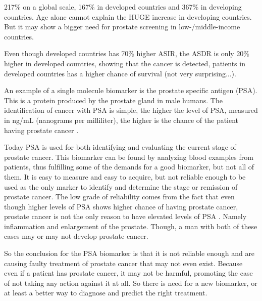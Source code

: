 \documentclass[UKenglish]{ifimaster}
\begin{document}
217\% on a global scale, 167\% in developed countries and 367\% in developing
countries. Age alone cannot explain the HUGE increase in developing countries.
But it may show a bigger need for prostate screening in low-/middle-income
countries.

Even though developed countries has 70\% higher ASIR, the ASDR is only 20\%
higher in developed countries, showing that the cancer is detected, patients in
developed countries has a higher chance of survival (not very surprising...).

An example of a single molecule biomarker is the prostate specific antigen
(PSA). This is a protein produced by the prostate gland in male humans. The
identification of cancer with PSA is simple, the higher the level of PSA,
measured in ng/mL (nanograms per milliliter), the higher is the chance of the
patient having prostate cancer \cite{cancerfacts}.

Today PSA is used for both identifying and evaluating the current stage of
prostate cancer. This biomarker can be found by analyzing blood examples from
patients, thus fulfilling some of the demands for a good biomarker, but not all
of them. It is easy to measure and easy to acquire, but not reliable enough to
be used as the only marker to identify and determine the stage or remission of
prostate cancer. The low grade of reliability comes from the fact that even
though higher levels of PSA shows higher chance of having prostate cancer,
prostate cancer is not the only reason to have elevated levels of PSA
\cite{cancerfacts}. Namely inflammation and enlargement of the prostate. Though,
a man with both of these cases may or may not develop prostate cancer.

So the conclusion for the PSA biomarker is that it is not reliable enough and
are causing faulty treatment of prostate cancer that may not even exist. Because
even if a patient has prostate cancer, it may not be harmful, promoting the case
of not taking any action against it at all. So there is need for a new
biomarker, or at least a better way to diagnose and predict the right treatment.
\end{document}
